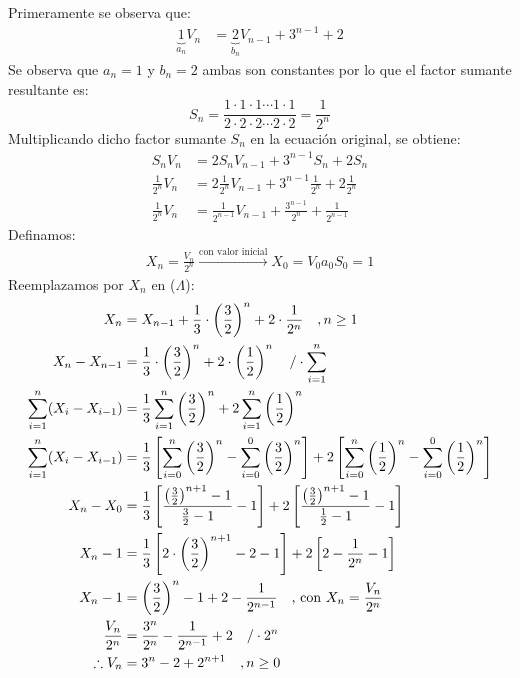 \begin{solution}
Primeramente se observa que:
\begin{align*}
    \underbrace{1}_{a_n}V_n &= \underbrace{2}_{b_n}V_{n-1} + 3^{n-1}+2
\end{align*}
Se observa que $a_n=1$ y $b_n=2$ ambas son constantes por lo que el factor sumante resultante es:
$$S_n = \frac{1\cdot 1\cdot 1 \cdots 1 \cdot 1}{2\cdot 2\cdot 2  \cdots 2 \cdot 2} = \frac{1}{2^n}$$ 
Multiplicando dicho factor sumante $S_n$ en la ecuación original, se obtiene:
\begin{align*}
    S_nV_n &= 2S_nV_{n-1} + 3^{n-1}S_n+2S_n\\
    \frac{1}{2^n}V_n &= 2\frac{1}{2^n}V_{n-1} + 3^{n-1}\frac{1}{2^n}+2\frac{1}{2^n}\\
    \frac{1}{2^n}V_n &= \frac{1}{2^{n-1}}V_{n-1} + \frac{3^{n-1}}{2^n}+\frac{1}{2^{n-1}} \tag{$\Lambda$}
\end{align*}
Definamos:
\begin{align*}
    X_n = \frac{V_n}{2^n} \xrightarrow{\text{con valor inicial}}X_0 = V_0a_0S_0 = 1
\end{align*}
Reemplazamos por $X_n$ en ($\Lambda$):
\begin{align*}
    X_n &= X_{n-1} + \frac{1}{3}\cdot \left(\frac{3}{2}\right)^n + 2\cdot \frac{1}{2^n} \quad, n \ge 1 \\
    X_n - X_{n-1} &=  \frac{1}{3}\cdot \left(\frac{3}{2}\right)^n + 2 \cdot \left(\frac{1}{2}\right)^n \quad \text{/}\cdot \sum\limits_{i=1}^{n}\\
    \sum\limits_{i=1}^{n} (X_i - X_{i-1}) &= \frac{1}{3}\sum\limits_{i=1}^{n}\left(\frac{3}{2}\right)^n + 2\sum\limits_{i=1}^{n}\left(\frac{1}{2}\right)^n \\
    \sum\limits_{i=1}^{n} (X_i - X_{i-1}) &= \frac{1}{3}\left[\sum\limits_{i=0}^{n}\left(\frac{3}{2}\right)^n - \sum\limits_{i=0}^{0}\left(\frac{3}{2}\right)^n  \right] + 2\left[\sum\limits_{i=0}^{n}\left(\frac{1}{2}\right)^n - \sum\limits_{i=0}^{0}\left(\frac{1}{2}\right)^n\right] \\
    X_n - X_0 &= \frac{1}{3} \left[ \frac{\left(\frac{3}{2}\right)^{n+1}-1}{\frac{3}{2}-1} - 1\right] + 2\left[ \frac{\left(\frac{3}{2}\right)^{n+1}-1}{\frac{1}{2}-1} -1\right]\\
    X_n - 1 &= \frac{1}{3}\left[2\cdot \left(\frac{3}{2}\right)^{n+1} -2 -1 \right] + 2 \left[2 - \frac{1}{2^n} -1 \right]\\
    X_n - 1 &= \left(\frac{3}{2}\right)^n -1 +2 -\frac{1}{2^{n-1}}\quad\text{, con } X_n = \frac{V_n}{2^n}\\
    \frac{V_n}{2^n} &= \frac{3^n}{2^n} - \frac{1}{2^{n-1}} +2 \quad \text{/}\cdot2^n\\
    \therefore V_n &= 3^n -2 +2^{n+1}\quad, n\ge0
\end{align*}
\end{solution}